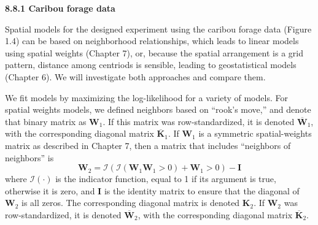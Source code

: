 \documentclass[12pt, titlepage]{article}
\begin{document}
\setcounter{equation}{0}
\renewcommand{\theequation}{R.\arabic{equation}}


%
%

{\large \flushleft \textbf{8.8.1 Caribou forage data}}

\vspace{.3cm}

Spatial models for the designed experiment using the caribou forage data (Figure 1.4) can be based on neighborhood relationships, which leads to linear models using spatial weights (Chapter 7), or, because the spatial arrangement is a grid pattern, distance among centriods is sensible, leading to geostatistical models (Chapter 6). We will investigate both approaches and compare them.

We fit models by maximizing the log-likelihood for a variety of models.  For spatial weights models, we defined neighbors based on ``rook's move,'' and denote that binary matrix as $\mathbf{W}_{1}$.  If this matrix was row-standardized, it is denoted $\overline{\mathbf{W}}_{1}$, with the corresponding diagonal matrix $\overline{\mathbf{K}}_{1}$.  If $\mathbf{W}_{1}$ is a symmetric spatial-weights matrix as described in Chapter 7, then a matrix that includes ``neighbors of neighbors'' is
$$
\mathbf{W}_{2} = \mathcal{I}(\mathcal{I}(\mathbf{W}_{1}\mathbf{W}_{1} > 0) + \mathbf{W}_{1} > 0) - \mathbf{I}
$$
where $\mathcal{I}(\cdot)$ is the indicator function, equal to 1 if its argument is true, otherwise it is zero, and $\mathbf{I}$ is the identity matrix to ensure that the diagonal of $\mathbf{W}_{2}$ is all zeros.  The corresponding diagonal matrix is denoted $\mathbf{K}_{2}$.  If $\mathbf{W}_{2}$ was row-standardized, it is denoted $\overline{\mathbf{W}}_{2}$, with the corresponding diagonal matrix $\overline{\mathbf{K}}_{2}$.
\end{document}
